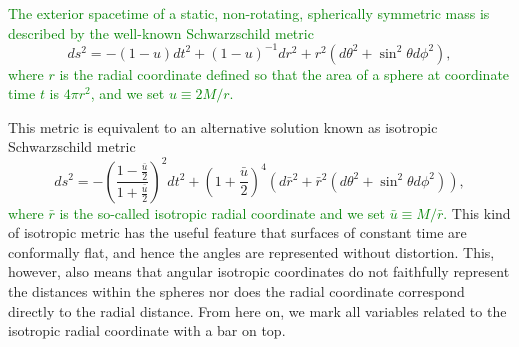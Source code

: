 \documentclass{aa}
\newcommand{\be}{\begin{equation}}
\newcommand{\ee}{\end{equation}}
\newcommand{\refe}[1]{\textcolor{green}{{#1}}}
\newcommand{\refedel}[1]{}
\newcommand{\sch}{Schwarzschild }
\newcommand{\rb}{\ensuremath{\bar{r}}}
\newcommand{\ub}{\ensuremath{\bar{u}}}
\begin{document}
\refedel{The spacetime metric around a static non-rotating spherically symmetric object is given by the well known \sch solution}
\refe{The exterior spacetime of a static, non-rotating, spherically symmetric mass is described by the well-known Schwarzschild metric}
\be
ds^2  = -(1-u) dt^2 + (1-u)^{-1}dr^2+r^2(d\theta^2+\sin^2\theta d\phi^2),
\ee
\refe{where $r$ is the radial coordinate defined so that the area of a sphere at coordinate time $t$ is $4\pi r^2$, and we set $u \equiv 2M/r$.}

This metric is equivalent to an alternative solution known as isotropic \sch metric \citep[see e.g.][]{MTW73}
\be
\label{eq:ISch}
ds^2 = -\left( \frac{1-\frac{\ub}{2}}{1+\frac{\ub}{2}} \right)^2 dt^2 + \left( 1+\frac{\ub}{2} \right)^4(d\rb^2 + \rb^2(d\theta^2+\sin^2\theta d\phi^2)),
\ee
\refe{where $\rb$ is the so-called isotropic radial coordinate and we set $\ub \equiv M/\rb$.}
This kind of isotropic metric has the useful feature that surfaces of constant time are conformally flat, and hence the angles are represented without distortion.
This, however, also means that angular isotropic coordinates do not faithfully represent the distances within the spheres nor does the radial coordinate correspond directly to the radial distance.
From here on, we mark all variables related to the isotropic radial coordinate with a bar on top.
\end{document}
